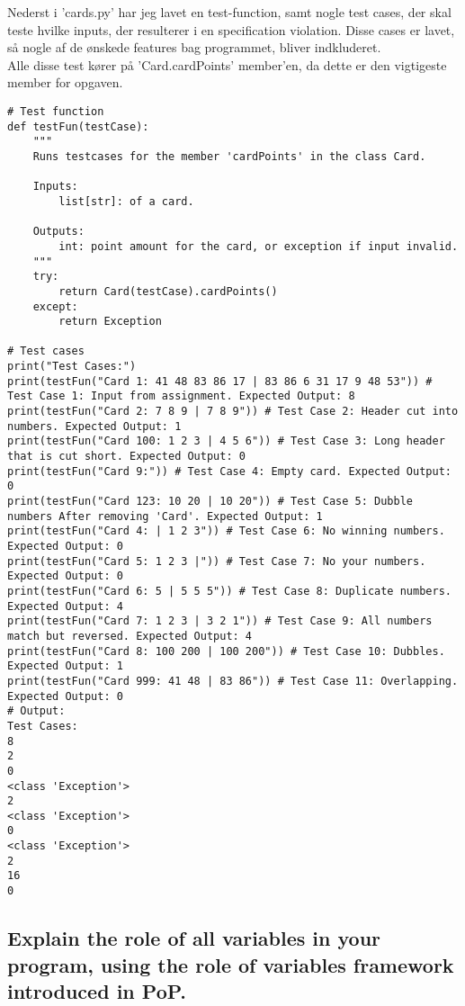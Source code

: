 \documentclass[a4paper,12pt]{article}
\begin{document}
Nederst i 'cards.py' har jeg lavet en test-function, samt nogle test cases, der skal teste hvilke inputs, der resulterer i en specification violation. Disse cases er lavet, så nogle af de ønskede features bag programmet, bliver indkluderet.\\
Alle disse test kører på 'Card.cardPoints' member'en, da dette er den vigtigeste member for opgaven.

\begin{lstlisting}
# Test function
def testFun(testCase):
    """
    Runs testcases for the member 'cardPoints' in the class Card.

    Inputs:
        list[str]: of a card.
    
    Outputs:
        int: point amount for the card, or exception if input invalid.
    """
    try:
        return Card(testCase).cardPoints()
    except:
        return Exception

# Test cases
print("Test Cases:")
print(testFun("Card 1: 41 48 83 86 17 | 83 86 6 31 17 9 48 53")) # Test Case 1: Input from assignment. Expected Output: 8
print(testFun("Card 2: 7 8 9 | 7 8 9")) # Test Case 2: Header cut into numbers. Expected Output: 1
print(testFun("Card 100: 1 2 3 | 4 5 6")) # Test Case 3: Long header that is cut short. Expected Output: 0
print(testFun("Card 9:")) # Test Case 4: Empty card. Expected Output: 0
print(testFun("Card 123: 10 20 | 10 20")) # Test Case 5: Dubble numbers After removing 'Card'. Expected Output: 1
print(testFun("Card 4: | 1 2 3")) # Test Case 6: No winning numbers. Expected Output: 0
print(testFun("Card 5: 1 2 3 |")) # Test Case 7: No your numbers. Expected Output: 0
print(testFun("Card 6: 5 | 5 5 5")) # Test Case 8: Duplicate numbers. Expected Output: 4
print(testFun("Card 7: 1 2 3 | 3 2 1")) # Test Case 9: All numbers match but reversed. Expected Output: 4
print(testFun("Card 8: 100 200 | 100 200")) # Test Case 10: Dubbles. Expected Output: 1
print(testFun("Card 999: 41 48 | 83 86")) # Test Case 11: Overlapping. Expected Output: 0
# Output:
Test Cases:
8
2
0
<class 'Exception'>
2
<class 'Exception'>
0
<class 'Exception'>
2
16
0
\end{lstlisting}

\subsection[Explain the role of all variables in your program]{Explain the role of all variables in your program, using the role of variables framework introduced in PoP.}
\end{document}
